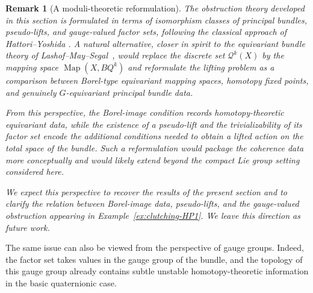 \documentclass[11pt,a4paper]{article}
\numberwithin{equation}{section}
\newtheorem{remark}[definition]{Remark}
\theoremstyle{named}
\begin{document}
\begin{remark}[A moduli-theoretic reformulation]
\label{rem:moduli-future-work}
The obstruction theory developed in this section is formulated in terms of isomorphism classes of principal bundles, pseudo-lifts, and gauge-valued factor sets, following the classical approach of Hattori--Yoshida \cite{hatyos}. A natural alternative, closer in spirit to the equivariant bundle theory of Lashof--May--Segal~\cite{lms}, would replace the discrete set \(\mathcal Q^k(X)\) by the mapping space \(\operatorname{Map}(X,BQ^k)\) and reformulate the lifting problem as a comparison between Borel-type equivariant mapping spaces, homotopy fixed points, and genuinely \(G\)-equivariant principal bundle data.

From this perspective, the Borel-image condition records homotopy-theoretic equivariant data, while the existence of a pseudo-lift and the trivializability of its factor set encode the additional conditions needed to obtain a lifted action on the total space of the bundle. Such a reformulation would package the coherence data more conceptually and would likely extend beyond the compact Lie group setting considered here.

We expect this perspective to recover the results of the present section and to clarify the relation between Borel-image data, pseudo-lifts, and the gauge-valued obstruction appearing in Example~\ref{ex:clutching-HP1}. We leave this direction as future work.
\end{remark}

The same issue can also be viewed from the perspective of gauge groups. Indeed, the factor set takes values in the gauge group of the bundle, and the topology of this gauge group already contains subtle unstable homotopy-theoretic information in the basic quaternionic case.
\end{document}
